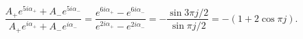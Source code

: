 \begin{equation} \label{monodromy}
\frac{A_+ e^{5i\alpha_+} + A_-e^{5i\alpha_-}}{A_+ e^{i\alpha_+} + A_-e^{i\alpha_-}} = \frac{e^{6i\alpha_+} - e^{6i\alpha_-}}{e^{2i\alpha_+}-e^{2i\alpha_-}} = -\frac{\sin 3\pi j/2}{\sin \pi j/2} = -(1 + 2 \cos \pi j).
\end{equation}

